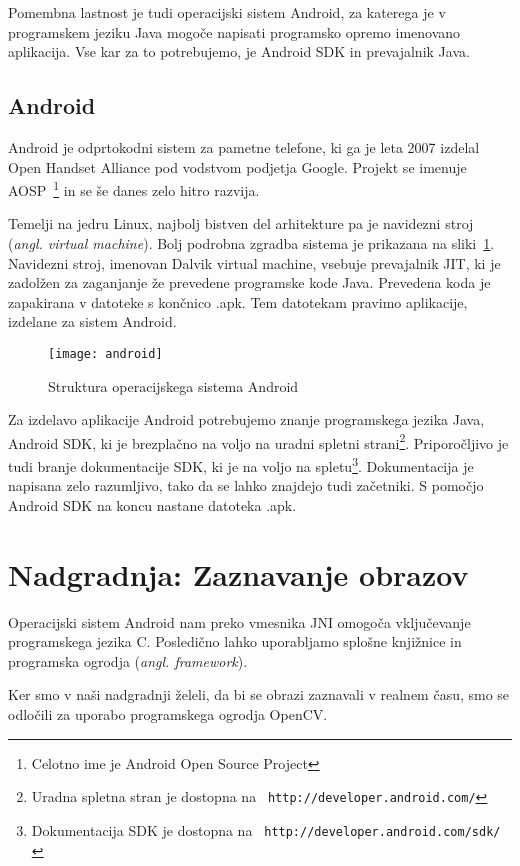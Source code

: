 Pomembna lastnost je tudi operacijski sistem Android, za katerega je v programskem jeziku Java mogoče napisati programsko opremo imenovano aplikacija. Vse kar za to potrebujemo, je Android SDK in prevajalnik Java.


\section{Android}
Android je odprtokodni sistem za pametne telefone, ki ga je leta 2007 izdelal Open Handset Alliance pod vodstvom podjetja Google. Projekt se imenuje AOSP~\footnote{Celotno ime je Android Open Source Project} in se še danes zelo
hitro razvija.

Temelji na jedru Linux, najbolj bistven del arhitekture pa je navidezni stroj (\textit{angl. virtual machine}). Bolj podrobna zgradba sistema je prikazana na sliki~\ref{picAndroid}. Navidezni stroj, imenovan
Dalvik virtual machine, vsebuje prevajalnik JIT, ki je zadolžen za zaganjanje že prevedene programske kode Java. Prevedena koda je zapakirana v datoteke s
končnico .apk. Tem datotekam pravimo aplikacije, izdelane za sistem Android.

\begin{figure}
    \centering
    \texttt{[image: android]}
    \caption{Struktura operacijskega sistema Android~\cite{wiki:Android}}
    \label{picAndroid}
\end{figure}

Za izdelavo aplikacije Android potrebujemo znanje programskega jezika Java, Android SDK, ki je brezplačno na voljo na uradni spletni strani\footnote{Uradna spletna stran je dostopna na {\tt
http://developer.android.com/}}. Priporočljivo je tudi branje dokumentacije
SDK, ki je na voljo na spletu\footnote{Dokumentacija SDK je dostopna na {\tt
http://developer.android.com/sdk/}}. Dokumentacija je napisana zelo razumljivo, tako da se lahko znajdejo tudi začetniki. S pomočjo Android SDK na koncu nastane
datoteka .apk.

\chapter{Nadgradnja: Zaznavanje obrazov}
Operacijski sistem Android nam preko vmesnika JNI omogoča vključevanje programskega jezika C. Posledično lahko uporabljamo splošne knjižnice in programska ogrodja (\textit{angl. framework}).

Ker smo v naši nadgradnji želeli, da bi se obrazi zaznavali v realnem času, smo se odločili za uporabo programskega ogrodja OpenCV.

